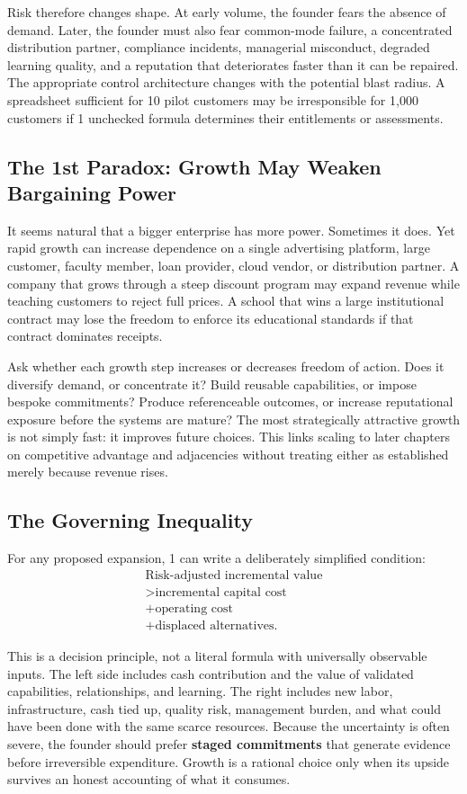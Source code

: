 Risk therefore changes shape. At early volume, the founder fears the absence of demand. Later, the founder must also fear common-mode failure, a concentrated distribution partner, compliance incidents, managerial misconduct, degraded learning quality, and a reputation that deteriorates faster than it can be repaired. The appropriate control architecture changes with the potential blast radius. A spreadsheet sufficient for 10 pilot customers may be irresponsible for 1,000 customers if 1 unchecked formula determines their entitlements or assessments.

\subsection{The 1st Paradox: Growth May Weaken Bargaining Power}
\label{sec:growth_weakens_bargaining_power}

It seems natural that a bigger enterprise has more power. Sometimes it does. Yet rapid growth can increase dependence on a single advertising platform, large customer, faculty member, loan provider, cloud vendor, or distribution partner. A company that grows through a steep discount program may expand revenue while teaching customers to reject full prices. A school that wins a large institutional contract may lose the freedom to enforce its educational standards if that contract dominates receipts.

Ask whether each growth step increases or decreases freedom of action. Does it diversify demand, or concentrate it? Build reusable capabilities, or impose bespoke commitments? Produce referenceable outcomes, or increase reputational exposure before the systems are mature? The most strategically attractive growth is not simply fast: it improves future choices. This links scaling to later chapters on competitive advantage and adjacencies without treating either as established merely because revenue rises.

\subsection{The Governing Inequality}
\label{sec:governing_inequality}

For any proposed expansion, 1 can write a deliberately simplified condition:
\begin{multline}
\label{eq:governing_inequality}
\text{Risk-adjusted incremental value} \\
> \text{incremental capital cost} \\
+ \text{operating cost} \\
+ \text{displaced alternatives}.
\end{multline}

This is a decision principle, not a literal formula with universally observable inputs. The left side includes cash contribution and the value of validated capabilities, relationships, and learning. The right includes new labor, infrastructure, cash tied up, quality risk, management burden, and what could have been done with the same scarce resources. Because the uncertainty is often severe, the founder should prefer \textbf{staged commitments} that generate evidence before irreversible expenditure. Growth is a rational choice only when its upside survives an honest accounting of what it consumes.
